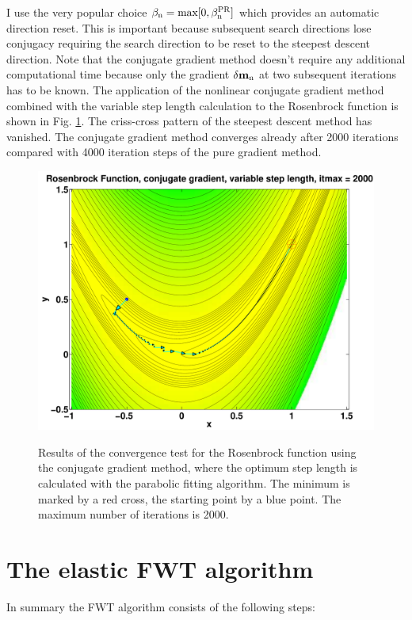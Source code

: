 I use the very popular choice $\rm{\beta_n = max[0,\beta_n^{PR}]}$ which provides an automatic direction reset. This is important because subsequent search directions lose conjugacy requiring the search direction to be reset to the steepest descent direction. Note that the conjugate gradient method doesn't require any additional computational time because only the gradient $\rm{\delta \mathbf{m}_n}$ at two subsequent iterations has to be known. The application of the nonlinear conjugate gradient method combined with the variable step length calculation to the Rosenbrock function is shown in Fig. \ref{Rosenbrock_cg}. The criss-cross pattern of the steepest descent method has vanished. The conjugate gradient method converges already after 2000 iterations compared with 4000 iteration steps of the pure gradient method.   

\begin{figure}[ht]
\includegraphics[width=17cm]{figures/Rosenbrock_4}\\
\caption{Results of the convergence test for the Rosenbrock function using the conjugate gradient method, where the optimum step length is calculated with the parabolic fitting algorithm. The minimum is marked by a red cross, the starting point by a blue point. The maximum number of iterations is 2000.}
\label{Rosenbrock_cg}
\end{figure}

\clearpage
\section{The elastic FWT algorithm}
In summary the FWT algorithm consists of the following steps:

